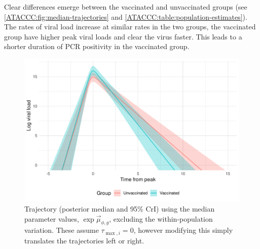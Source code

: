 \documentclass[thesis.tex]{subfiles}
\begin{document}
Clear differences emerge between the vaccinated and unvaccinated groups (see \cref{ATACCC:fig:median-trajectories} and \cref{ATACCC:table:population-estimates}).
The rates of viral load increase at similar rates in the two groups, the vaccinated group have higher peak viral loads and clear the virus faster.
This leads to a shorter duration of PCR positivity in the vaccinated group.
\begin{figure}
  \centering \includegraphics{ATACCC/mean_trajectories}
  \caption[Mean viral load trajectories]{Trajectory (posterior median and 95\% CrI) using the median parameter values, $\exp \vec{\mu}_{\phi,g}$, excluding the within-population variation. These assume $\tau_{\max,i}=0$, however modifying this simply translates the trajectories left or right. \label{ATACCC:fig:mean-trajectories}}
\end{figure}
\begin{table}
  \caption{Population-level estimates of the viral load parameters (posterior medians and 95\% CrI). The vaccinated population have higher peak viral loads but clear the virus faster. \label{ATACCC:table:population-estimates}}
\end{table}
\end{document}
